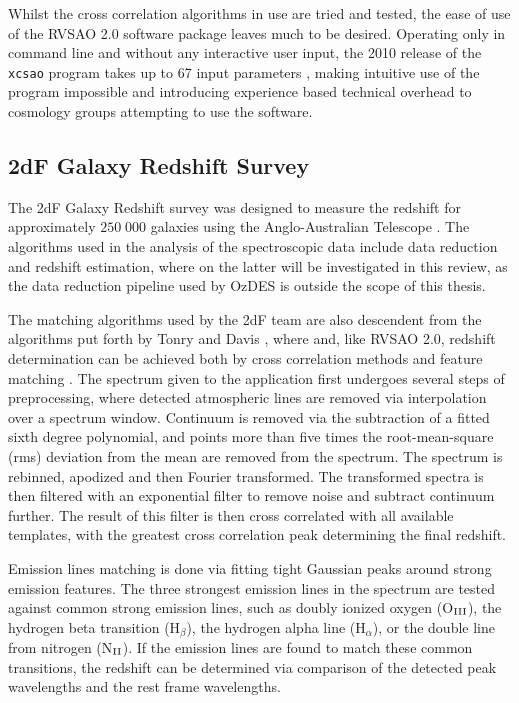 \documentclass[titlesmallcaps, examinerscopy, copyrightpage]{uqthesis}
\begin{document}
Whilst the cross correlation algorithms in use are tried and tested, the ease of use of the RVSAO 2.0 software package leaves much to be desired. Operating only in command line and without any interactive user input, the 2010 release of the \verb+xcsao+ program takes up to 67 input parameters \cite{parameters}, making intuitive use of the program impossible and introducing experience based technical overhead to cosmology groups attempting to use the software.

\subsection{2dF Galaxy Redshift Survey}
The 2dF Galaxy Redshift survey was designed to measure the redshift for approximately $250\;000$ galaxies using the Anglo-Australian Telescope \cite{colless20012df}. The algorithms used in the analysis of the spectroscopic data include data reduction and redshift estimation, where on the latter will be investigated in this review, as the data reduction pipeline used by OzDES is outside the scope of this thesis.

The matching algorithms used by the 2dF team are also descendent from the algorithms put forth by Tonry and Davis \cite{tonry1979survey}, where and, like RVSAO 2.0, redshift determination can be achieved both by cross correlation methods and feature matching \cite{colless20012df}. The spectrum given to the application first undergoes several steps of preprocessing, where detected atmospheric lines are removed via interpolation over a spectrum window. Continuum is removed via the subtraction of a fitted sixth degree polynomial, and points more than five times the root-mean-square (rms) deviation from the mean are removed from the spectrum. The spectrum is rebinned, apodized and then Fourier transformed. The transformed spectra is then filtered with an exponential filter to remove noise and subtract continuum further. The result of this filter is then cross correlated with all available templates, with the greatest cross correlation peak determining the final redshift.

Emission lines matching is done via fitting tight Gaussian peaks around strong emission features. The three strongest emission lines in the spectrum are tested against common strong emission lines, such as doubly ionized oxygen (O$_{\rm{III}}$), the hydrogen beta transition (H$_\beta$), the hydrogen alpha line (H$_\alpha$), or the double line from nitrogen (N$_{\rm{II}}$). If the emission lines are found to match these common transitions, the redshift can be determined via comparison of the detected peak wavelengths and the rest frame wavelengths.
\end{document}
